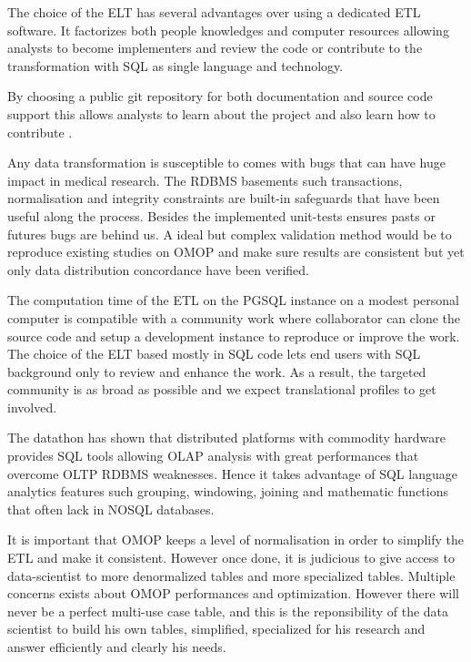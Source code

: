 The choice of the ELT has several advantages over using a dedicated ETL
software. It factorizes both people knowledges and computer resources allowing
analysts to become implementers and review the code or contribute to the
transformation with SQL as single language and technology.

By choosing a public git repository for both documentation and source code
support this allows analysts to learn about the project and also learn how to
contribute \cite{mimic-git}.


Any data transformation is susceptible to comes with bugs that can have huge
impact in medical research. The RDBMS basements such transactions,
normalisation and integrity constraints are built-in safeguards that have been
useful along the process. Besides the implemented unit-tests ensures pasts or
futures bugs are behind us. A ideal but complex \cite{johnson-reprod}
validation method would be to reproduce existing studies on OMOP and make sure
results are consistent but yet only data distribution concordance have been
verified.

The computation time of the ETL on the PGSQL instance on a modest personal
computer is compatible with a community work where collaborator can clone the
source code and setup a development instance to reproduce or improve the work.
The choice of the ELT based mostly in SQL code lets end users with SQL
background only to review and enhance the work. As a result, the targeted
community is as broad as possible and we expect translational profiles to get
involved.

The datathon has shown that distributed platforms with commodity hardware
provides SQL tools allowing OLAP analysis with great performances that overcome
OLTP RDBMS weaknesses. Hence it takes advantage of SQL language analytics
features such grouping, windowing, joining and mathematic functions that often
lack in NOSQL databases.

It is important that OMOP keeps a level of normalisation in order to simplify
the ETL and make it consistent. However once done, it is judicious to give
access to data-scientist to more denormalized tables and more specialized
tables. Multiple concerns exists about OMOP performances and optimization.
However there will never be a perfect multi-use case table, and this is the
reponsibility of the data scientist to build his own tables, simplified,
specialized for his research and answer efficiently and clearly his needs.

